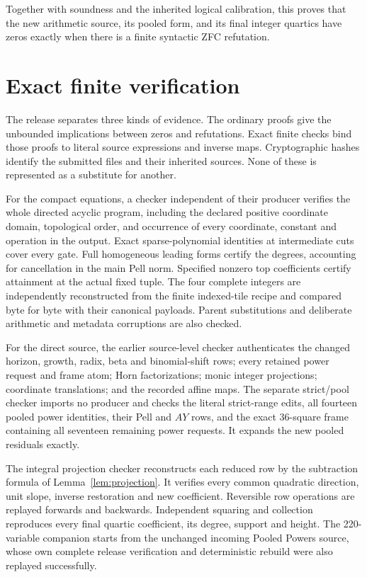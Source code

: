 \documentclass[11pt]{article}
\theoremstyle{remark}\newtheorem{remark}[theorem]{Remark}
\begin{document}
Together with soundness and the inherited logical calibration, this
proves that the new arithmetic source, its pooled form, and its final
integer quartics have zeros exactly when there is a finite syntactic
ZFC refutation.






\section{Exact finite verification}\label{sec:verification}
The release separates three kinds of evidence. The ordinary proofs give
the unbounded implications between zeros and refutations. Exact finite
checks bind those proofs to literal source expressions and inverse maps.
Cryptographic hashes identify the submitted files and their inherited
sources. None of these is represented as a substitute for another.

For the compact equations, a checker independent of their producer
verifies the whole directed acyclic program, including the declared
positive coordinate domain, topological order, and occurrence of every
coordinate, constant and operation in the output. Exact sparse-polynomial
identities at intermediate cuts cover every gate. Full homogeneous
leading forms certify the degrees, accounting for cancellation in the
main Pell norm. Specified nonzero top coefficients certify attainment
at the actual fixed tuple. The four complete integers are independently
reconstructed from the finite indexed-tile recipe and compared byte for
byte with their canonical payloads. Parent substitutions and deliberate
arithmetic and metadata corruptions are also checked.

For the direct source, the earlier source-level checker authenticates
the changed horizon, growth, radix, beta and binomial-shift rows; every
retained power request and frame atom; Horn factorizations; monic integer
projections; coordinate translations; and the recorded affine maps.
The separate strict/pool checker imports no producer and checks the
literal strict-range edits, all fourteen pooled power identities, their
Pell and $AY$ rows, and the exact 36-square frame containing all seventeen
remaining power requests. It expands the new pooled residuals exactly.

The integral projection checker reconstructs each reduced row by the
subtraction formula of Lemma~\ref{lem:projection}. It verifies every
common quadratic direction, unit slope, inverse restoration and new
coefficient. Reversible row operations are replayed forwards and
backwards. Independent squaring and collection reproduces every final
quartic coefficient, its degree, support and height. The 220-variable
companion starts from the unchanged incoming Pooled Powers source,
whose own complete release verification and deterministic rebuild
were also replayed successfully.
\end{document}
